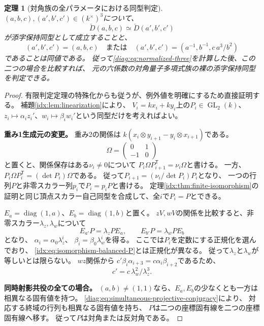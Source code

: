 \documentclass[11pt,a4paper]{ltjsarticle}
\newtheorem{theorem}{定理}[section]
\theoremstyle{definition}
\newcommand{\GL}{\operatorname{GL}}
\begin{document}
\begin{theorem}[対角族の全パラメータにおける同型判定]
\label{diag:thm:indexed-isomorphism}
$(a,b,c),(a',b',c')\in(k^\times)^3$について、
\[
\check D(a,b,c)\simeq\check D(a',b',c')
\]
が添字保持同型として成立することと、
\[
(a',b',c')=(a,b,c)
\quad\text{または}\quad
(a',b',c')=\left(a^{-1},b^{-1},c\,a^3/b^2\right)
\]
であることは同値である。
従って\eqref{diag:eq:normalized-three}を計算した後、この二つの場合を比較すれば、
元の六係数の対角量子多項式族の裸の添字保持同型を判定できる。
\end{theorem}
\begin{proof}
有限判定定理の特殊化からも従うが、例外値を明確にするため直接証明する。
補題\ref{idx:lem:linearization}により、
$V_i=kx_i+ky_i$上の$P_i\in\GL_2(k)$、
$z_i\mapsto\alpha_i z_i'$、$w_i\mapsto\beta_i w_i'$という同型だけを考えればよい。

\par\smallskip\noindent\textbf{重み1生成元の変更。}\quad
重み2の関係は
$k(x_i\otimes y_{i+1}-y_i\otimes x_{i+1})$である。
\[
\Omega=\begin{pmatrix}0&1\\-1&0\end{pmatrix}
\]
と置くと、関係保存はある$\nu_i\ne0$について
$P_i\Omega P_{i+1}^{\mathsf T}=\nu_i\Omega$と書ける。
一方、$P_i\Omega P_i^{\mathsf T}=(\det P_i)\Omega$である。
従って$P_{i+1}=(\nu_i/\det P_i)P_i$となり、
一つの行列$P$と非零スカラー列$p_i$で$P_i=p_iP$と書ける。
定理\ref{idx:thm:finite-isomorphism}の証明と同じ頂点スカラー自己同型を合成して、全$i$で$P_i=P$とできる。

$E_a=\operatorname{diag}(1,a)$、$E_b=\operatorname{diag}(1,b)$と置く。
$zV,wV$の関係を比較すると、非零スカラー$\lambda_z,\lambda_w$について
\begin{equation}\label{diag:eq:simultaneous-projective-conjugacy}
E_{a'}P=\lambda_zPE_a,\qquad
E_{b'}P=\lambda_wPE_b
\end{equation}
となり、
$\alpha_i=\alpha_0\lambda_z^i$、
$\beta_i=\beta_0\lambda_w^i$を得る。
ここでは$P_i$を定数にする正規化を選んでおり、
\eqref{idx:eq:isomorphism-balanced-P}とは正規化が異なる。
従って$\lambda_z$と$\lambda_w$が等しいとは限らない。
$wz$関係から
$c'\beta_i\alpha_{i+3}=c\alpha_i\beta_{i+2}$であるため、
\begin{equation}\label{diag:eq:third-parameter-transform}
c'=c\,\lambda_w^2/\lambda_z^3.
\end{equation}

\par\smallskip\noindent\textbf{同時射影共役の全ての場合。}\quad
$(a,b)\ne(1,1)$なら、$E_a,E_b$の少なくとも一方は相異なる固有値を持つ。
\eqref{diag:eq:simultaneous-projective-conjugacy}により、
対応する終域の行列も相異なる固有値を持ち、
$P$は二つの座標固有線を二つの座標固有線へ移す。
従って$P$は対角または反対角である。


\end{proof}
\end{document}
